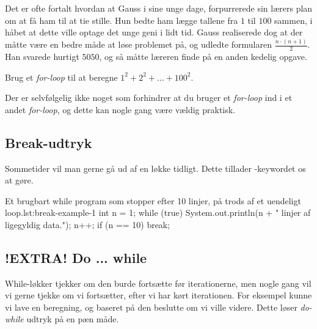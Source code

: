		\begin{exercise}
			Det er ofte fortalt hvordan at Gauss i sine unge dage, forpurrerede sin
			lærers plan om at få ham til at tie stille. Hun bedte ham lægge tallene
			fra \(1\) til \(100\) sammen, i håbet at dette ville optage det unge
			geni i lidt tid. Gauss realiserede dog at der måtte være en bedre måde
			at løse problemet på, og udledte formularen \(\frac{n\cdot(n+1)}{2}\).
			Han svarede hurtigt \(5050\), og så måtte læreren finde på en anden
			kedelig opgave.

			Brug et \emph{for-loop} til at beregne \(1^2+2^2+\dots+100^2\).
		\end{exercise}

		\begin{exercise}
			Der er selvfølgelig ikke noget som forhindrer at du bruger et
			\emph{for-loop} ind i et andet \emph{for-loop}, og dette kan nogle gang
			være vældig praktisk.

		\end{exercise}

	\subsection{Break-udtryk}


		Sommetider vil man gerne gå ud af en løkke tidligt. Dette tillader
		-keywordet os at gøre.

		\begin{JavaCode}{Et brugbart while program som stopper efter 10 linjer, på trods af et uendeligt loop.}{lst:break-example-1}
			int n = 1;
			while (true) {
				System.out.println(n + " linjer af ligegyldig data.");
				n++;
				if (n == 10)  break;
			}
		\end{JavaCode}



	\subsection{!EXTRA! Do ... while}


		While-løkker tjekker om den burde fortsætte før iterationerne, men nogle
		gang vil vi gerne tjekke om vi fortsætter, efter vi har kørt
		iterationen. For eksempel kunne vi lave en beregning, og baseret på den
		beslutte om vi ville videre. Dette løser \emph{do-while} udtryk på en
		pæn måde.

